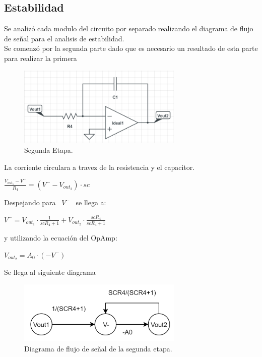\subsection{Estabilidad}
Se analizó cada modulo del circuito por separado realizando el diagrama de flujo de señal para el analisis de estabilidad.\\
Se comenzó por la segunda parte dado que es necesario un resultado de esta parte para realizar la primera

\begin{figure}[htb]	
	\centering
	\includegraphics[width=0.7\textwidth]{imagenes/SegundaEtapa.PNG}
	\caption{Segunda Etapa.}
	\label{fig:SegundaEtapa}
\end{figure}
La corriente circulara a travez de la resistencia y el capacitor.\\
\begin{center}
$ \frac{V_{out_1}-V^-}{R_4} = (V^--V_{out_2})\cdot sc$ \\
\end{center}
 Despejando para \ $V^-$ \ se llega a: \\
\begin{center}
$V^- = V_{out_1} \cdot \frac{1}{scR_4+1}+V_{out_2} \cdot \frac{scR_4}{scR_4+1}$\\\end{center}
y utilizando la ecuación del OpAmp:\\
\begin{center}
$V_{out_2}=A_0 \cdot (-V^-)$
\end{center}
Se llega al siguiente diagrama
\begin{figure}[H]	
	\centering
	\includegraphics[width=0.7\textwidth]{imagenes/SegundaEtapaDiagrama.PNG}
	\caption{Diagrama de flujo de señal de la segunda etapa.}
	\label{fig:SegundaEtapaDiagrama}
\end{figure}

